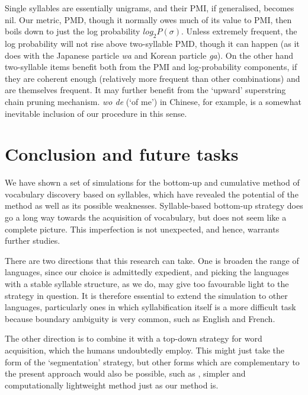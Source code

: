\documentclass[a4]{article}
\begin{document}
Single syllables are essentially unigrams, and their PMI, if generalised, becomes nil. Our metric, PMD, though it normally owes much of its value to PMI, then boils down to just the log probability $log_2 P(\sigma)$. Unless extremely frequent, the log probability will not rise above two-syllable PMD, though it can happen (as it does with the Japanese particle \emph{wa} and Korean particle \emph{ga}). On the other hand two-syllable items benefit both from the PMI and log-probability components, if they are coherent enough (relatively more frequent than other combinations) and are themselves frequent. It may further benefit from the `upward' superstring chain pruning mechanism. \emph{wo de} (`of me') in Chinese, for example, is a somewhat inevitable inclusion of our procedure in this sense.


\section{Conclusion and future tasks}

We have shown a set of simulations for the bottom-up and cumulative method of vocabulary discovery based on syllables, which have revealed the potential of the method as well as its possible weaknesses. Syllable-based bottom-up strategy does go a long way towards the acquisition of vocabulary, but does not seem like a complete picture. This imperfection is not unexpected, and hence, warrants further studies.

There are two directions that this research can take. One is broaden the range of languages, since our choice is admittedly expedient, and picking the languages with a stable syllable structure, as we do,   may give too favourable light to the strategy in question. It is therefore essential to extend the simulation to other languages, particularly ones in which syllabification itself is a more difficult task because boundary ambiguity is very common, such as English and French.

The other direction is to combine it with a top-down strategy for word acquisition, which the humans undoubtedly employ. This might just take the form of the `segmentation' strategy, but other forms which are complementary to the present approach would also be possible, such as \cite{ChenEtAl11_simpleSegmentation}, simpler and computationally lightweight method just as our method is.







\end{document}
